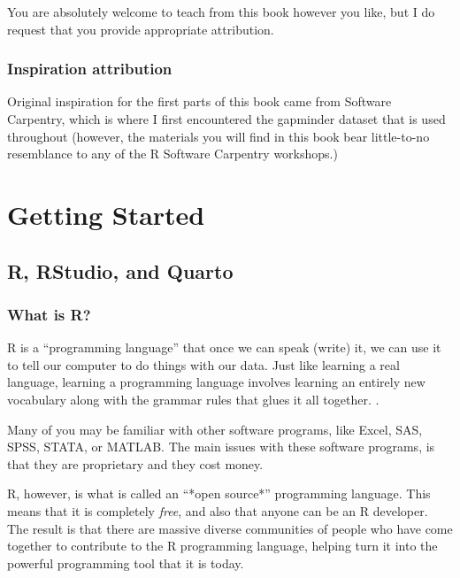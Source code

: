 \documentclass[
  letterpaper,
  DIV=11,
  numbers=noendperiod]{scrreprt}
\begin{document}

You are absolutely welcome to teach from this book however you like, but
I do request that you provide appropriate attribution.

\section*{Inspiration attribution}\label{inspiration-attribution}


Original inspiration for the first parts of this book came from Software
Carpentry, which is where I first encountered the gapminder dataset that
is used throughout (however, the materials you will find in this book
bear little-to-no resemblance to any of the R Software Carpentry
workshops.)

\part{Getting Started}

\chapter{R, RStudio, and Quarto}\label{r-rstudio-and-quarto}

\section{What is R?}\label{what-is-r}

R is a ``programming language'' that once we can speak (write) it, we
can use it to tell our computer to do things with our data. Just like
learning a real language, learning a programming language involves
learning an entirely new vocabulary along with the grammar rules that
glues it all together. .

Many of you may be familiar with other software programs, like Excel,
SAS, SPSS, STATA, or MATLAB. The main issues with these software
programs, is that they are proprietary and they cost money.

R, however, is what is called an ``*open source*'' programming language.
This means that it is completely \emph{free}, and also that anyone can
be an R developer. The result is that there are massive diverse
communities of people who have come together to contribute to the R
programming language, helping turn it into the powerful programming tool
that it is today.
\end{document}
